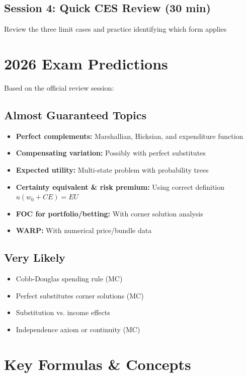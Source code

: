 \documentclass[11pt]{article}
\begin{document}
\subsection*{Session 4: Quick CES Review (30 min)}

Review the three limit cases and practice identifying which form applies

\section{2026 Exam Predictions}

Based on the official review session:

\subsection*{Almost Guaranteed Topics}

\begin{itemize}
    \item \textbf{Perfect complements:} Marshallian, Hicksian, and expenditure function
    \item \textbf{Compensating variation:} Possibly with perfect substitutes
    \item \textbf{Expected utility:} Multi-state problem with probability trees
    \item \textbf{Certainty equivalent \& risk premium:} Using correct definition $u(w_0 + CE) = EU$
    \item \textbf{FOC for portfolio/betting:} With corner solution analysis
    \item \textbf{WARP:} With numerical price/bundle data
\end{itemize}

\subsection*{Very Likely}

\begin{itemize}
    \item Cobb-Douglas spending rule (MC)
    \item Perfect substitutes corner solutions (MC)
    \item Substitution vs. income effects
    \item Independence axiom or continuity (MC)
\end{itemize}

\section{Key Formulas \& Concepts}
\end{document}

